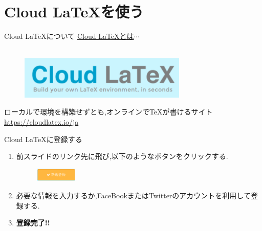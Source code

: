 \documentclass[dvipdfmx]{beamer}
\begin{document}
  \section{Cloud LaTeXを使う}
  \begin{frame}{Cloud LaTeXについて}
    \Large
    \underline{Cloud LaTeXとは$\cdots$}\\~\\
    \begin{figure}[h]
      \centering
      \includegraphics[width=8cm]{images/CloudLaTeX.png}
    \end{figure}
    \centering
    {\small ローカルで環境を構築せずとも,オンラインで\TeX が書けるサイト}\\
    {\small \url{https://cloudlatex.io/ja}}
  \end{frame}
  \begin{frame}{Cloud LaTeXに登録する}
    \small
    \begin{enumerate}
      \item {\scriptsize 前スライドのリンク先に飛び,以下のようなボタンをクリックする.}
            \begin{figure}[h]
              \centering
              \includegraphics[width=2cm]{images/shinkitouroku.png}
            \end{figure}
      \item {\scriptsize 必要な情報を入力するか,FaceBookまたはTwitterのアカウントを利用して登録する.}
      \item {\small \bf 登録完了!!}
    \end{enumerate}
  \end{frame}
\end{document}
